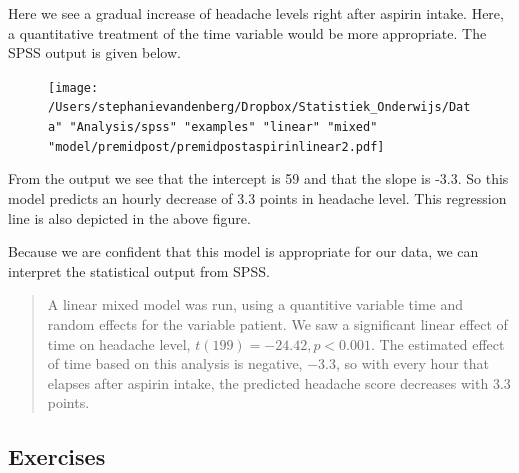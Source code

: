 \documentclass[]{report}\usepackage[]{graphicx}\usepackage[]{color}
\begin{document}
Here we see a gradual increase of headache levels right after aspirin intake. Here, a quantitative treatment of the time variable would be more appropriate. The SPSS output is given below.


\begin{figure}[h]
    \begin{center}
       \texttt{[image: /Users/stephanievandenberg/Dropbox/Statistiek\_Onderwijs/Data" "Analysis/spss" "examples" "linear" "mixed" "model/premidpost/premidpostaspirinlinear2.pdf]}
    \end{center}
\end{figure}


From the output we see that the intercept is 59 and that the slope is -3.3. So this model predicts an hourly decrease of 3.3 points in headache level. This regression line is also depicted in the above figure. 

Because we are confident that this model is appropriate for our data, we can interpret the statistical output from SPSS. 

\begin{quotation}
A linear mixed model was run, using a quantitive variable time and random effects for the variable patient. We saw a significant linear effect of time on headache level, $t(199)=-24.42, p < 0.001$. The estimated effect of time based on this analysis is negative, $-3.3$, so with every hour that elapses after aspirin intake, the predicted headache score decreases with 3.3 points. 
\end{quotation}


\subsection{Exercises}
\end{document}
